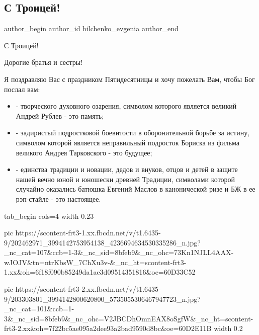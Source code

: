  
 
 
 
 
 
\subsection{С Троицей!}
\label{sec:20_06_2021.fb.bilchenko_evgenia.1.troica}
\ifcmt
 author_begin
   author_id bilchenko_evgenia
 author_end
\fi

С Троицей!

Дорогие братья и сестры! 

Я поздравляю Вас с праздником Пятидесятницы и хочу пожелать Вам, чтобы Бог послал вам: 

\begin{itemize}
  \item - творческого духовного озарения, символом которого является великий Андрей Рублев - это память;
  \item - задиристый подростковой боевитости в оборонительной борьбе за истину, символом которой является неправильный подросток Бориска из фильма великого Андрея Тарковского - это будущее;
  \item - единства традиции и новации, дедов и внуков, отцов и детей в защите нашей вечно юной и юношески древней Традиции, символами которой случайно оказались батюшка Евгений Маслов в канонической ризе и БЖ в ее рэп-стайле - это настоящее.
\end{itemize}

\ifcmt
  tab_begin cols=4
     width 0.23

     pic https://scontent-frt3-1.xx.fbcdn.net/v/t1.6435-9/202462971_3994142753954138_4236694634530335286_n.jpg?_nc_cat=107&ccb=1-3&_nc_sid=8bfeb9&_nc_ohc=73Kn1NJLL4AAX-wJOJV&tn=ntrKbsW_7ChXu3v-&_nc_ht=scontent-frt3-1.xx&oh=6f18f090b85249da1ae3d09514351816&oe=60D33C52

     pic https://scontent-frt3-2.xx.fbcdn.net/v/t1.6435-9/203303801_3994142800620800_5735055306467947723_n.jpg?_nc_cat=101&ccb=1-3&_nc_sid=8bfeb9&_nc_ohc=V2JBCDhOmnEAX8oSgfW&_nc_ht=scontent-frt3-2.xx&oh=7f22bc5ae095a2dee93a2bad9590d8bc&oe=60D2E11B
     width 0.2

